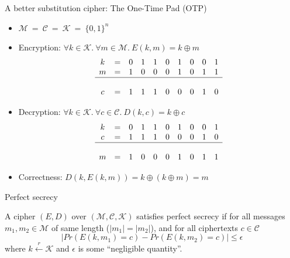 \documentclass[aspectratio=169, lualatex, handout, 10pt,dvipsnames,svgnames]{beamer} %
\newcommand{\Kcal}{\mathcal{K}}
\newcommand{\Mcal}{\mathcal{M}}
\newcommand{\Ccal}{\mathcal{C}}
\begin{document}
\begin{frame}{A better substitution cipher: The One-Time Pad (OTP)}
  \pause

  \begin{itemize}

  \item $\Mcal\ =\ \Ccal\ =\ \Kcal\ =\ \{0, 1\}^n$
    \medskip{}
    \pause

  \item Encryption: $\forall k\in\Kcal.\ \forall m\in\Mcal.\ E(k, m) = k \oplus m$
    \pause
    \color{vert}
    \[
    \begin{array}[t]{ccccccccccccccccccccc}
      k & = & 0 & 1 & 1 & 0 & 1 & 0 & 0 & 1 \\
      m & = & 1 & 0 & 0 & 0 & 1 & 0 & 1 & 1 \\
      \hline \\
      c & = & 1 & 1 & 1 & 0 & 0 & 0 & 1 & 0
    \end{array}
    \]
    \color{black}
    \pause

  \item Decryption: $\forall k\in\Kcal.\ \forall c\in\Ccal.\ D(k, c) = k \oplus c$
    \pause
    \color{vert}
    \[
    \begin{array}[t]{ccccccccccccccccccccc}
      k & = & 0 & 1 & 1 & 0 & 1 & 0 & 0 & 1 \\
      c & = & 1 & 1 & 1 & 0 & 0 & 0 & 1 & 0 \\
      \hline \\
      m & = & 1 & 0 & 0 & 0 & 1 & 0 & 1 & 1
    \end{array}
    \]
    \color{black}
    \pause

  \item Correctness: $D(k, E(k, m)) = k \oplus (k\oplus m) = m$
  \end{itemize}
\end{frame}

\begin{frame}{Perfect secrecy}
  

  \begin{definition}
    A cipher $(E, D)$ over $(\Mcal, \Ccal, \Kcal)$ satisfies perfect secrecy if for all messages $m_1, m_2\in\Mcal$ of same length ($|m_1|=|m_2|$), and for all ciphertexts $c\in\Ccal$
    \[
    \left| Pr(E(k, m_1) = c) - Pr(E(k, m_2) = c)
    \right| \le \epsilon
    \]
    where $k \xleftarrow[]{r} \Kcal$ and $\epsilon$ is some ``negligible quantity''.
  \end{definition}

\end{frame}
\end{document}
